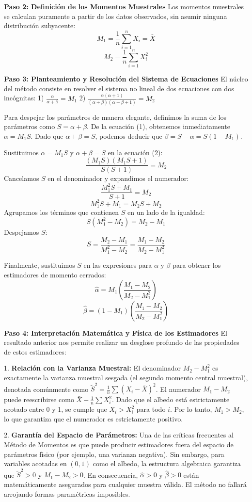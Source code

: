 \textbf{Paso 2: Definición de los Momentos Muestrales}
Los momentos muestrales se calculan puramente a partir de los datos observados, sin asumir ninguna distribución subyacente:
$$ M_1 = \frac{1}{n} \sum_{i=1}^n X_i = \bar{X} $$
$$ M_2 = \frac{1}{n} \sum_{i=1}^n X_i^2 $$

\textbf{Paso 3: Planteamiento y Resolución del Sistema de Ecuaciones}
El núcleo del método consiste en resolver el sistema no lineal de dos ecuaciones con dos incógnitas:
1) $\frac{\alpha}{\alpha + \beta} = M_1$
2) $\frac{\alpha(\alpha + 1)}{(\alpha + \beta)(\alpha + \beta + 1)} = M_2$

Para despejar los parámetros de manera elegante, definimos la suma de los parámetros como $S = \alpha + \beta$. 
De la ecuación (1), obtenemos inmediatamente $\alpha = M_1 S$. Dado que $\alpha + \beta = S$, podemos deducir que $\beta = S - \alpha = S(1 - M_1)$.

Sustituimos $\alpha = M_1 S$ y $\alpha + \beta = S$ en la ecuación (2):
$$ \frac{(M_1 S)(M_1 S + 1)}{S(S + 1)} = M_2 $$
Cancelamos $S$ en el denominador y expandimos el numerador:
$$ \frac{M_1^2 S + M_1}{S + 1} = M_2 $$
$$ M_1^2 S + M_1 = M_2 S + M_2 $$
Agrupamos los términos que contienen $S$ en un lado de la igualdad:
$$ S(M_1^2 - M_2) = M_2 - M_1 $$
Despejamos $S$:
$$ S = \frac{M_2 - M_1}{M_1^2 - M_2} = \frac{M_1 - M_2}{M_2 - M_1^2} $$

Finalmente, sustituimos $S$ en las expresiones para $\alpha$ y $\beta$ para obtener los estimadores de momento cerrados:
$$ \hat{\alpha} = M_1 \left( \frac{M_1 - M_2}{M_2 - M_1^2} \right) $$
$$ \hat{\beta} = (1 - M_1) \left( \frac{M_1 - M_2}{M_2 - M_1^2} \right) $$

\textbf{Paso 4: Interpretación Matemática y Física de los Estimadores}
El resultado anterior nos permite realizar un desglose profundo de las propiedades de estos estimadores:

1. \textbf{Relación con la Varianza Muestral:} 
El denominador $M_2 - M_1^2$ es exactamente la varianza muestral sesgada (el segundo momento central muestral), denotada comúnmente como $\tilde{S}^2 = \frac{1}{n}\sum(X_i - \bar{X})^2$. 
El numerador $M_1 - M_2$ puede reescribirse como $\bar{X} - \frac{1}{n}\sum X_i^2$. Dado que el albedo está estrictamente acotado entre 0 y 1, se cumple que $X_i > X_i^2$ para todo $i$. Por lo tanto, $M_1 > M_2$, lo que garantiza que el numerador es estrictamente positivo. 

2. \textbf{Garantía del Espacio de Parámetros:}
Una de las críticas frecuentes al Método de Momentos es que puede producir estimadores fuera del espacio de parámetros físico (por ejemplo, una varianza negativa). Sin embargo, para variables acotadas en $(0,1)$ como el albedo, la estructura algebraica garantiza que $\tilde{S}^2 > 0$ y $M_1 - M_2 > 0$. En consecuencia, $\hat{\alpha} > 0$ y $\hat{\beta} > 0$ están matemáticamente asegurados para cualquier muestra válida. El método no fallará arrojando formas paramétricas imposibles.

